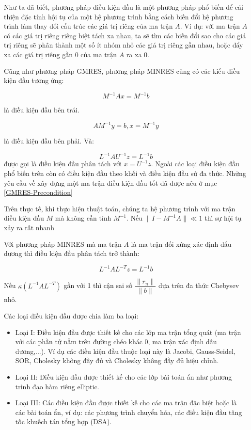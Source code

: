 \documentclass[14pt, a4paper]{article}
\numberwithin{equation}{section}
\numberwithin{algorithm}{section}
\numberwithin{figure}{section}
\numberwithin{dl}{section}
\numberwithin{md}{section}
\numberwithin{bd}{section}
\numberwithin{dn}{section}
\begin{document}
Như ta đã biết, phương pháp điều kiện đầu là một phương pháp phổ biến để cải thiện đặc tính hội tụ của một hệ phương trình bằng cách biến đổi hệ phương trình làm thay đổi cấu trúc các giá trị riêng của ma trận $A$.
Ví dụ: với ma trận $A$ có các giá trị riêng riêng biệt tách xa nhau, ta sẽ tìm các biến đổi sao cho các giá trị riêng sẽ phân thành một số ít nhóm nhỏ các giá trị riêng gần nhau, hoặc đẩy xa các giá trị riêng gần 0 của ma trận $A$ ra xa 0.

Cũng như phương pháp GMRES, phương pháp MINRES cũng có các kiểu điều kiện đầu tương ứng:

\begin{equation}
    M^{-1}Ax = M^{-1}b
\end{equation}

là điều kiện đầu bên trái.

\begin{equation}
    AM^{-1}y = b, x = M^{-1}y
\end{equation}

là điều kiện đầu bên phải. Và:

\begin{equation}
    L^{-1}AU^{-1}z = L^{-1}b
\end{equation}
được gọi là điều kiện đầu phân tách với $x = U^{-1}z$.
Ngoài các loại điều kiện đầu phổ biến trên còn có điều kiện đầu theo khối và điều kiện đầu sử đa thức.
Những yêu cầu về xây dựng một ma trận điều kiện đầu tốt đã được nêu ở mục \ref{GMRES-Precondition}

Trên thực tế, khi thực hiện thuật toán, chúng ta hệ phương trình với ma trận điều kiện đầu $M$ mà không cần tính $M^{-1}$.
Nếu $\lVert I - M^{-1} A \rVert \ll 1$ thì sự hội tụ xảy ra rất nhanh

Với phương pháp MINRES mà ma trận $A$ là ma trận đối xứng xác định dấu dương thì điều kiện đầu phân tách trở thành:

\begin{equation}
    L^{-1}A L^{-T} z = L^{-1}b
\end{equation}

Nếu $\kappa(L^{-1}AL^{-T})$ gần với 1 thì cận sai số $\dfrac{\lVert r_n \rVert}{\lVert b \rVert}$ dựa trên đa thức Chebysev nhỏ.

Các loại điều kiện đầu được chia làm ba loại:

\begin{itemize}
    \item Loại I: Điều kiện đầu được thiết kế cho các lớp ma trận tổng quát (ma trận với các phần tử nằm trên đường chéo khác 0, ma trận xác định dấu dương,...). Ví dụ các điều kiện đầu thuộc loại này là Jacobi, Gauss-Seidel, SOR, Cholesky không đầy đủ và Cholesky không đầy đủ hiệu chỉnh.
    \item Loại II: Điều kiện đầu được thiết kế cho các lớp bài toán ẩn như phương trình đạo hàm riêng elliptic.
    \item Loại III: Các điều kiện đầu được thiết kế cho các ma trận đặc biệt hoặc là các bài toán ẩn, ví dụ: các phương trình chuyển hóa, các điều kiện đầu tăng tốc khuếch tán tổng hợp (DSA).
\end{itemize}
\end{document}
